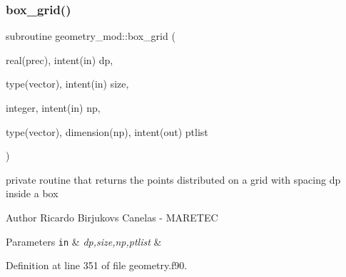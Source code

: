 \subsubsection{\texorpdfstring{box\+\_\+grid()}{box\_grid()}}
{\footnotesize\ttfamily subroutine geometry\+\_\+mod\+::box\+\_\+grid (\begin{DoxyParamCaption}\item[{real(prec), intent(in)}]{dp,  }\item[{type(vector), intent(in)}]{size,  }\item[{integer, intent(in)}]{np,  }\item[{type(vector), dimension(np), intent(out)}]{ptlist }\end{DoxyParamCaption})\hspace{0.3cm}{\ttfamily [private]}}



private routine that returns the points distributed on a grid with spacing dp inside a box 

\begin{DoxyAuthor}{Author}
Ricardo Birjukovs Canelas -\/ M\+A\+R\+E\+T\+EC
\end{DoxyAuthor}

\begin{DoxyParams}[1]{Parameters}
\mbox{\tt in}  & {\em dp,size,np,ptlist} & \\
\hline
\end{DoxyParams}


Definition at line 351 of file geometry.\+f90.


